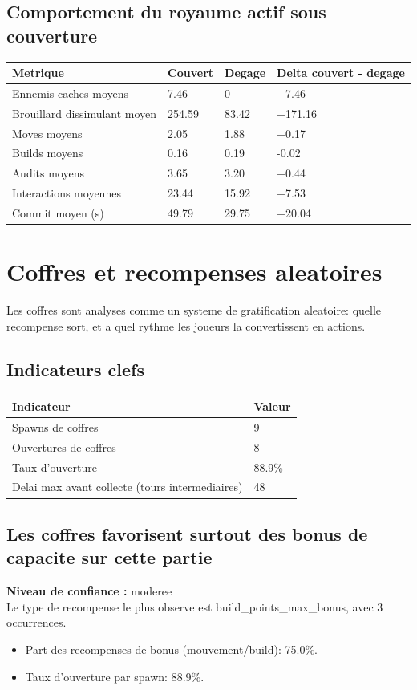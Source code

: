 \documentclass[11pt,a4paper]{article}
\begin{document}
\subsection*{Comportement du royaume actif sous couverture}
\begin{tabularx}{\linewidth}{X|X|X|X}
\toprule
Metrique & Couvert & Degage & Delta couvert - degage \\
\midrule
Ennemis caches moyens & 7.46 & 0 & +7.46 \\
Brouillard dissimulant moyen & 254.59 & 83.42 & +171.16 \\
Moves moyens & 2.05 & 1.88 & +0.17 \\
Builds moyens & 0.16 & 0.19 & -0.02 \\
Audits moyens & 3.65 & 3.20 & +0.44 \\
Interactions moyennes & 23.44 & 15.92 & +7.53 \\
Commit moyen (s) & 49.79 & 29.75 & +20.04 \\
\bottomrule
\end{tabularx}
\section{Coffres et recompenses aleatoires}
Les coffres sont analyses comme un systeme de gratification aleatoire: quelle recompense sort, et a quel rythme les joueurs la convertissent en actions.
\subsection*{Indicateurs clefs}
\begin{tabularx}{\linewidth}{lX}
\toprule
Indicateur & Valeur \\
\midrule
Spawns de coffres & 9 \\
Ouvertures de coffres & 8 \\
Taux d'ouverture & 88.9\% \\
Delai max avant collecte (tours intermediaires) & 48 \\
\bottomrule
\end{tabularx}
\subsection*{Les coffres favorisent surtout des bonus de capacite sur cette partie}
\textbf{Niveau de confiance :} moderee\\
Le type de recompense le plus observe est build\_points\_max\_bonus, avec 3 occurrences.
\begin{itemize}
\item Part des recompenses de bonus (mouvement/build): 75.0\%.
\item Taux d'ouverture par spawn: 88.9\%.
\end{itemize}
\end{document}
